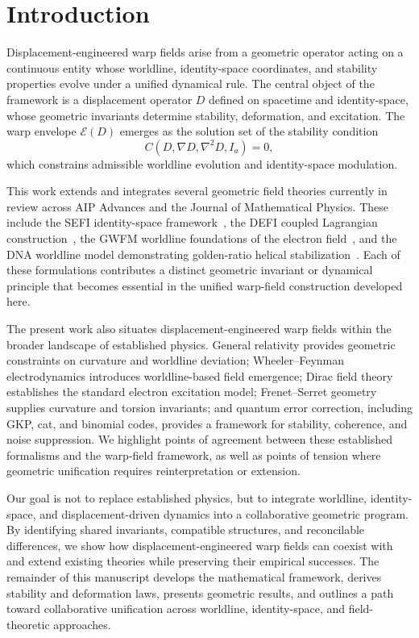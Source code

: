 \documentclass[aip,adv,reprint]{revtex4-2}
\begin{document}
\section{Introduction}

Displacement-engineered warp fields arise from a geometric operator acting on a
continuous entity whose worldline, identity-space coordinates, and stability
properties evolve under a unified dynamical rule. The central object of the
framework is a displacement operator $D$ defined on spacetime and identity-space,
whose geometric invariants determine stability, deformation, and excitation. The
warp envelope $\mathcal{E}(D)$ emerges as the solution set of the stability
condition
\begin{equation}
C(D,\nabla D,\nabla^2 D,I_a)=0,
\end{equation}
which constrains admissible worldline evolution and identity-space modulation.

This work extends and integrates several geometric field theories currently in
review across AIP Advances and the Journal of Mathematical Physics. These
include the SEFI identity-space framework~\cite{Dutton_SEFI_JMP_2026},
the DEFI coupled Lagrangian construction~\cite{Dutton_DEFI_2026},
the GWFM worldline foundations of the electron field~\cite{Dutton_GWFM_JMP_2026},
and the DNA worldline model demonstrating golden-ratio helical stabilization~\cite{Dutton_DNA_2026}.
Each of these formulations contributes a distinct geometric invariant or
dynamical principle that becomes essential in the unified warp-field
construction developed here.

The present work also situates displacement-engineered warp fields within the
broader landscape of established physics. General relativity provides geometric
constraints on curvature and worldline deviation; Wheeler--Feynman
electrodynamics introduces worldline-based field emergence; Dirac field theory
establishes the standard electron excitation model; Frenet--Serret geometry
supplies curvature and torsion invariants; and quantum error correction,
including GKP, cat, and binomial codes, provides a framework for stability,
coherence, and noise suppression. We highlight points of agreement between these
established formalisms and the warp-field framework, as well as points of
tension where geometric unification requires reinterpretation or extension.

Our goal is not to replace established physics, but to integrate worldline,
identity-space, and displacement-driven dynamics into a collaborative geometric
program. By identifying shared invariants, compatible structures, and
reconcilable differences, we show how displacement-engineered warp fields can
coexist with and extend existing theories while preserving their empirical
successes. The remainder of this manuscript develops the mathematical framework,
derives stability and deformation laws, presents geometric results, and outlines
a path toward collaborative unification across worldline, identity-space, and
field-theoretic approaches.
\end{document}
